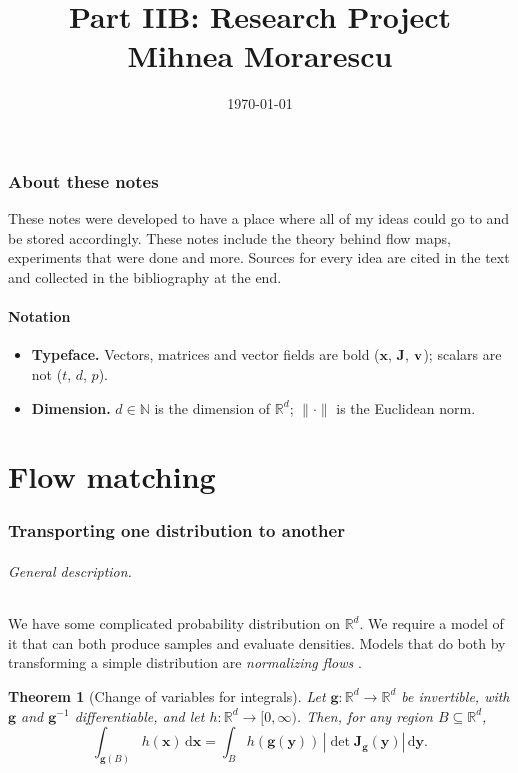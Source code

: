 \documentclass[11pt,a4paper]{article}
\title{Part IIB: Research Project\\[0.4em]
\large Mihnea Morarescu}
\author{}
\date{\today}
\numberwithin{equation}{section}     %
\theoremstyle{plain}        %
\newtheorem{theorem}{Theorem}[section]
\theoremstyle{definition}   %
\theoremstyle{remark}       %
\newcommand{\R}{\mathbb{R}}
\newcommand{\N}{\mathbb{N}}
\newcommand{\vx}{\mathbf{x}}  \newcommand{\vy}{\mathbf{y}}  \newcommand{\vz}{\mathbf{z}}
\newcommand{\mJ}{\mathbf{J}}  \newcommand{\mU}{\mathbf{U}}  \newcommand{\mV}{\mathbf{V}}
\begin{document}
\maketitle

\section*{About these notes}

These notes were developed to have a place where all of my ideas could go to and be stored accordingly. These notes include the theory behind flow maps, experiments that were done and more. Sources for every idea are cited in the text and collected in the bibliography at the end.

\subsection*{Notation}
\begin{itemize}
\item \textbf{Typeface.} Vectors, matrices and vector fields are bold ($\vx$, $\mJ$, $\mathbf{v}$); scalars are not ($t$, $d$, $p$).
\item \textbf{Dimension.} $d\in\N$ is the dimension of $\R^d$; $\|\cdot\|$ is the Euclidean norm.
\end{itemize}

\tableofcontents

\clearpage

\part{Flow matching}

\section{Transporting one distribution to another}

\paragraph{General description.} We have some complicated probability distribution on $\mathbb{R}^d$. We require a model of it that can both produce samples and evaluate densities. Models that do both by transforming a simple distribution are \emph{normalizing flows} \citep{rezende2015}.

\begin{theorem}[Change of variables for integrals]\label{thm:cov-int}
Let $\mathbf{g}:\mathbb{R}^d\to\mathbb{R}^d$ be invertible, with $\mathbf{g}$ and $\mathbf{g}^{-1}$ differentiable, and let $h:\mathbb{R}^d\to[0,\infty)$. Then, for any region $B\subseteq\mathbb{R}^d$,
\[
\int_{\mathbf{g}(B)}h(\mathbf{x})\,\mathrm{d}\mathbf{x}=\int_B h(\mathbf{g}(\mathbf{y}))\,\left|\det\mathbf{J}_{\mathbf{g}}(\mathbf{y})\right|\,\mathrm{d}\mathbf{y} .
\]
\end{theorem}
\end{document}
